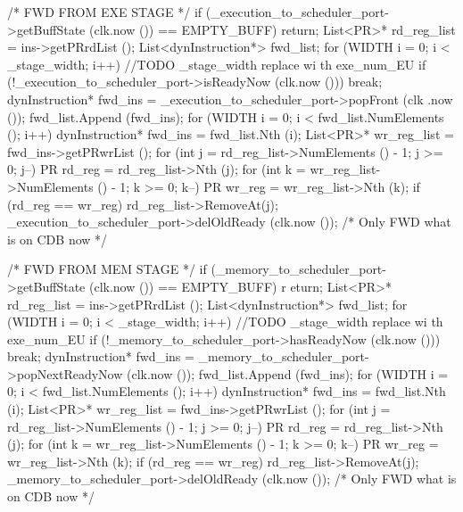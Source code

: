 \begin{DoxyCode}
                                                                     {
    { /* FWD FROM EXE STAGE */
        if (_execution_to_scheduler_port->getBuffState (clk.now ()) == 
      EMPTY_BUFF) return;
        List<PR>* rd_reg_list = ins->getPRrdList ();
        List<dynInstruction*> fwd_list;
        for (WIDTH i = 0; i < _stage_width; i++) { //TODO _stage_width replace wi
      th exe_num_EU
            if (!_execution_to_scheduler_port->isReadyNow (clk.now ())) break;
            dynInstruction* fwd_ins = _execution_to_scheduler_port->popFront (clk
      .now ());
            fwd_list.Append (fwd_ins);
        }
        for (WIDTH i = 0; i < fwd_list.NumElements (); i++) {
            dynInstruction* fwd_ins = fwd_list.Nth (i);
            List<PR>* wr_reg_list = fwd_ins->getPRwrList ();
            for (int j = rd_reg_list->NumElements () - 1; j >= 0; j--) {
                PR rd_reg = rd_reg_list->Nth (j);
                for (int k = wr_reg_list->NumElements () - 1; k >= 0; k--) {
                    PR wr_reg = wr_reg_list->Nth (k);
                    if (rd_reg == wr_reg) {
                        rd_reg_list->RemoveAt(j);
                    }
                }
            }
        }
        _execution_to_scheduler_port->delOldReady (clk.now ()); /* Only FWD what 
      is on CDB now */
    }

    { /* FWD FROM MEM STAGE */
        if (_memory_to_scheduler_port->getBuffState (clk.now ()) == EMPTY_BUFF) r
      eturn;
        List<PR>* rd_reg_list = ins->getPRrdList ();
        List<dynInstruction*> fwd_list;
        for (WIDTH i = 0; i < _stage_width; i++) { //TODO _stage_width replace wi
      th exe_num_EU
            if (!_memory_to_scheduler_port->hasReadyNow (clk.now ())) break;
            dynInstruction* fwd_ins = _memory_to_scheduler_port->popNextReadyNow 
      (clk.now ());
            fwd_list.Append (fwd_ins);
        }
        for (WIDTH i = 0; i < fwd_list.NumElements (); i++) {
            dynInstruction* fwd_ins = fwd_list.Nth (i);
            List<PR>* wr_reg_list = fwd_ins->getPRwrList ();
            for (int j = rd_reg_list->NumElements () - 1; j >= 0; j--) {
                PR rd_reg = rd_reg_list->Nth (j);
                for (int k = wr_reg_list->NumElements () - 1; k >= 0; k--) {
                    PR wr_reg = wr_reg_list->Nth (k);
                    if (rd_reg == wr_reg) {
                        rd_reg_list->RemoveAt(j);
                    }
                }
            }
        }
        _memory_to_scheduler_port->delOldReady (clk.now ()); /* Only FWD what is 
      on CDB now */
    }
}
\end{DoxyCode}


